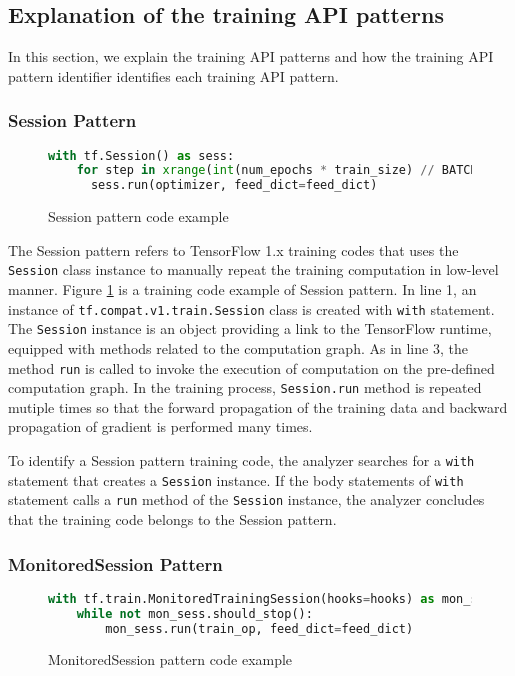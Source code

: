 \subsection{Explanation of the training API patterns}

In this section, we explain the training API patterns and how
the training API pattern identifier identifies each training API pattern.

\subsubsection{Session Pattern}

\begin{figure}[!ht]
\begin{lstlisting}[language=Python]
with tf.Session() as sess:
    for step in xrange(int(num_epochs * train_size) // BATCH_SIZE):
      sess.run(optimizer, feed_dict=feed_dict)
\end{lstlisting}
\caption{Session pattern code example}
\label{fig:sessionpattern}
\end{figure}
The Session pattern refers to TensorFlow 1.x training codes that
uses the {\tt Session} class instance to manually repeat the training 
computation in low-level manner.
Figure \ref{fig:sessionpattern} is a training code example of 
Session pattern.
In line 1, an instance of {\tt tf.compat.v1.train.Session} class is 
created with {\tt with} statement.
The {\tt Session} instance is an object providing a link to 
the TensorFlow runtime, equipped with methods related to the computation graph.
As in line 3, the method {\tt run} is called to invoke the
execution of computation on the pre-defined computation graph.
In the training process, {\tt Session.run} method is repeated mutiple times
so that the forward propagation of the training data and
backward propagation of gradient is performed many times.

To identify a Session pattern training code,
the analyzer searches for a {\tt with} statement that creates a
{\tt Session} instance.
If the body statements of {\tt with} statement calls a 
{\tt run} method of the {\tt Session} instance,
the analyzer concludes that the training code belongs to the Session pattern.

\subsubsection{MonitoredSession Pattern}

\begin{figure}[!ht]
  \begin{lstlisting}[language=Python]
with tf.train.MonitoredTrainingSession(hooks=hooks) as mon_sess:
    while not mon_sess.should_stop():
        mon_sess.run(train_op, feed_dict=feed_dict)
  \end{lstlisting}
  \caption{MonitoredSession pattern code example}
  \label{fig:monsesspattern}
\end{figure}


